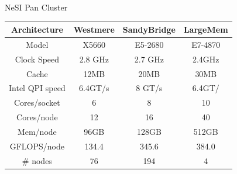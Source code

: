 \documentclass[final,t]{beamer}
\begin{document}
\begin{frame}[fragile]{}
\begin{columns}[t]
\begin{column}{.32\linewidth}
      \begin{block}{NeSI Pan Cluster}
        \vspace*{-2ex}
      \begin{center}
      \begin{tabular}{|c|c|c|c|}
      \hline 
      \textbf{Architecture} & \textbf{Westmere} & \textbf{SandyBridge} & \textbf{LargeMem} \\ 
      \hline 
      Model & X5660 & E5-2680 & E7-4870 \\ 
      \hline 
      Clock Speed & 2.8 GHz & 2.7 GHz & 2.4GHz \\ 
      \hline 
      Cache & 12MB & 20MB & 30MB \\ 
      \hline 
      Intel QPI speed & 6.4GT/s & 8 GT/s & 6.4GT/ \\ 
      \hline 
      Cores/socket & 6 & 8 & 10 \\ 
      \hline       
      Cores/node & 12 & 16 & 40 \\ 
      \hline 
      Mem/node & 96GB & 128GB & 512GB \\ 
      \hline 
      GFLOPS/node & 134.4 & 345.6 & 384.0 \\ 
      \hline 
      \# nodes & 76 & 194 & 4 \\ 
      \hline 
      \end{tabular} 
      \end{center}
        \vspace*{-2ex}
      \end{block}



\end{column}
\end{columns}
\end{frame}
\end{document}
